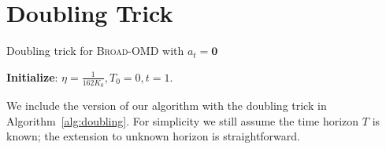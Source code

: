\section{Doubling Trick}
\label{app:doubling_trick}

\begin{algorithm}[t]
\DontPrintSemicolon
\caption{Doubling trick for \textsc{Broad-OMD} with $a_t=\mathbf{0}$}
\label{alg:doubling}
\textbf{Initialize}: $\eta=\frac{1}{162K_0}, T_0=0, t=1.$\\
\end{algorithm}

We include the version of our algorithm with the doubling trick in Algorithm~\ref{alg:doubling}.
For simplicity we still assume the time horizon $T$ is known; the extension to unknown horizon is straightforward. 

